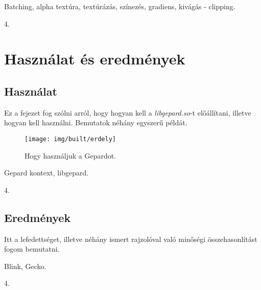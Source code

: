 \documentclass[12pt]{report}
\theoremstyle{definition}
\begin{document}
  \begin{description}[noitemsep]
    \item[Kulcsszavak] Batching, alpha textúra, textúrázás, színezés,
    gradiens, kivágás - clipping.
    \item[Becsült oldalszám] 4.
  \end{description}



    \chapter{Használat és eredmények}

    \section{Használat}

  Ez a fejezet fog szólni arról, hogy hogyan kell a \emph{libgepard.so}-t
előállítani, illetve hogyan kell használni. Bemutatok néhány egyszerű
példát.

  \begin{figure}[!htb]
    \centering
    \texttt{[image: img/built/erdely]}
    \caption{\label{erdely} Hogy használjuk a Gepardot.}
  \end{figure}

  \begin{description}[noitemsep]
    \item[Kulcsszavak] Gepard kontext, libgepard.
    \item[Becsült oldalszám] 4.
  \end{description}

    \section{Eredmények}
    \label{Eredmények}

  Itt a lefedettséget, illetve néhány ismert rajzolóval való minőségi
összehasonlítást fogom bemutatni.

  \begin{description}[noitemsep]
    \item[Kulcsszavak] Blink, Gecko.
    \item[Becsült oldalszám] 4.
  \end{description}
\end{document}
